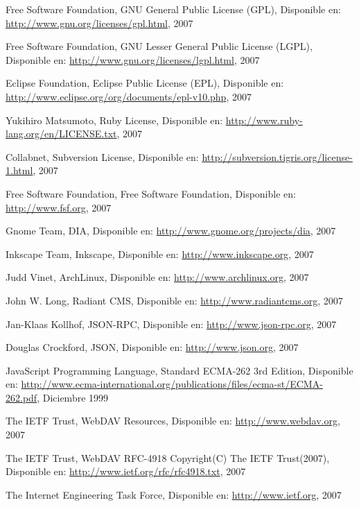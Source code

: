 \begin{thebibliography}{99}

 Free Software Foundation, GNU General Public License (GPL), Disponible en:
	\url{http://www.gnu.org/licenses/gpl.html}, 2007

 Free Software Foundation, GNU Lesser General Public License (LGPL), Disponible en:
	\url{http://www.gnu.org/licenses/lgpl.html}, 2007

 Eclipse Foundation, Eclipse Public License (EPL), Disponible en:
	\url{http://www.eclipse.org/org/documents/epl-v10.php}, 2007

 Yukihiro Matsumoto, Ruby License, Disponible en:
	\url{http://www.ruby-lang.org/en/LICENSE.txt}, 2007

 Collabnet, Subversion License, Disponible en:
	\url{http://subversion.tigris.org/license-1.html}, 2007

 Free Software Foundation, Free Software Foundation, Disponible en:
	\url{http://www.fsf.org}, 2007

 Gnome Team, DIA, Disponible en:
	\url{http://www.gnome.org/projects/dia}, 2007

 Inkscape Team, Inkscape, Disponible en:
	\url{http://www.inkscape.org}, 2007

 Judd Vinet, ArchLinux, Disponible en:
	\url{http://www.archlinux.org}, 2007

 John W. Long, Radiant CMS, Disponible en:
	\url{http://www.radiantcms.org}, 2007

 Jan-Klaas Kollhof, JSON-RPC, Disponible en:
	\url{http://www.json-rpc.org}, 2007

 Douglas Crockford, JSON, Disponible en:
	\url{http://www.json.org}, 2007

 JavaScript Programming Language, Standard ECMA-262 3rd Edition, Disponible en:
	\url{http://www.ecma-international.org/publications/files/ecma-st/ECMA-262.pdf}, Diciembre 1999

 The IETF Trust, WebDAV Resources, Disponible en:
	\url{http://www.webdav.org}, 2007

 The IETF Trust, WebDAV RFC-4918 Copyright(C) The IETF Trust(2007), Disponible en:
	\url{http://www.ietf.org/rfc/rfc4918.txt}, 2007

 The Internet Engineering Task Force, Disponible en:
	\url{http://www.ietf.org}, 2007


\end{thebibliography}
